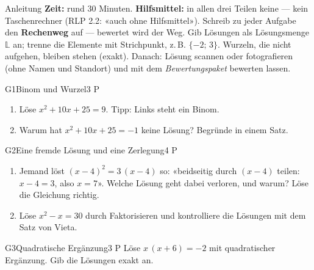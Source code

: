 \documentclass[11pt]{article}
\begin{document}

\begin{lpinfo}{Anleitung}
\textbf{Zeit:} rund 30 Minuten. \textbf{Hilfsmittel:} in allen drei Teilen keine — kein Taschenrechner (RLP 2.2: «auch ohne Hilfsmittel»).
Schreib zu jeder Aufgabe den \textbf{Rechenweg} auf — bewertet wird der Weg. Gib Lösungen als Lösungsmenge $\mathbb{L}$ an; trenne die Elemente mit Strichpunkt, z.\,B. $\{-2;\, 3\}$. Wurzeln, die nicht aufgehen, bleiben stehen (exakt).
Danach: Lösung scannen oder fotografieren (ohne Namen und Standort) und mit dem \emph{Bewertungspaket} bewerten lassen.
\end{lpinfo}


\begin{lpaufgabe}{G1}{Binom und Wurzel}{3 P}
\begin{enumerate}[label=(\alph*),leftmargin=*,itemsep=1pt]
\item Löse $x^2 + 10x + 25 = 9$. Tipp: Links steht ein Binom.
\item Warum hat $x^2 + 10x + 25 = -1$ keine Lösung? Begründe in einem Satz.
\end{enumerate}
\end{lpaufgabe}

\begin{lpaufgabe}{G2}{Eine fremde Lösung und eine Zerlegung}{4 P}
\begin{enumerate}[label=(\alph*),leftmargin=*,itemsep=1pt]
\item Jemand löst $(x - 4)^2 = 3\,(x - 4)$ so: «beidseitig durch $(x - 4)$ teilen: $x - 4 = 3$, also $x = 7$». Welche Lösung geht dabei verloren, und warum? Löse die Gleichung richtig.
\item Löse $x^2 - x = 30$ durch Faktorisieren und kontrolliere die Lösungen mit dem Satz von Vieta.
\end{enumerate}
\end{lpaufgabe}


\begin{lpaufgabe}{G3}{Quadratische Ergänzung}{3 P}
Löse $x\,(x + 6) = -2$ mit quadratischer Ergänzung. Gib die Lösungen exakt an.
\end{lpaufgabe}
\end{document}
